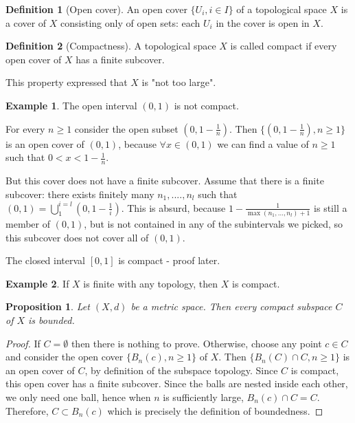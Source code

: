 \documentclass{article}
\theoremstyle{definition}
\newtheorem{defn}{Definition}[section]
\newtheorem{exmp}{Example}[section]
\theoremstyle{plain}%
\newtheorem{prop}[thm]{Proposition}
\theoremstyle{remark}
\newcommand{\Union}{\bigcup}
\newcommand{\intersection}{\cap}
\begin{document}
\begin{defn}[Open cover]
    An open cover $\{U_i, i \in I\}$ of a topological space $X$ is a cover of $X$ consisting only of open sets: each $U_i$ in the cover is open in $X$.
\end{defn}

\begin{defn}[Compactness]
    A topological space $X$ is called compact if every open cover of $X$ has a finite subcover.
\end{defn}

This property expressed that $X$ is "not too large".

\begin{exmp}
    The open interval $(0,1)$ is not compact.
    
    For every $n \ge 1$ consider the open subset $(0,1 - \frac{1}{n})$. Then $\{(0, 1- \frac{1}{n}), n \ge 1\}$ is an open cover of $(0,1)$, because $\forall x \in (0,1)$ we can find a value of $n \ge 1$ such that $0 < x < 1-\frac{1}{n}$.
    
    But this cover does not have a finite subcover. Assume that there is a finite subcover: there exists finitely many $n_1, ...., n_l$ such that $(0,1) = \Union_{1}^{i=l} (0, 1- \frac{1}{i})$. This is absurd, because $1 - \frac{1}{\max(n_1, ..., n_l) + 1}$ is still a member of $(0,1)$, but is not contained in any of the subintervals we picked, so this subcover does not cover all of $(0,1)$.
    
    The closed interval $[0,1]$ is compact - proof later.
\end{exmp}

\begin{exmp}
    If $X$ is finite with any topology, then $X$ is compact.
\end{exmp}

\begin{prop}
    Let $(X,d)$ be a metric space. Then every compact subspace $C$ of $X$ is bounded.
\end{prop}

\begin{proof}
    If $C = \emptyset$ then there is nothing to prove. Otherwise, choose any point $c \in C$ and consider the open cover $\{B_n(c), n \ge 1\}$ of $X$. Then $\{B_n(C) \intersection C, n \ge 1\}$ is an open cover of $C$, by definition of the subspace topology. Since $C$ is compact, this open cover has a finite subcover. Since the balls are nested inside each other, we only need one ball, hence when $n$ is sufficiently large, $B_n(c) \intersection C = C$. Therefore, $C \subset B_n(c)$ which is precisely the definition of boundedness. 
\end{proof}
\end{document}
